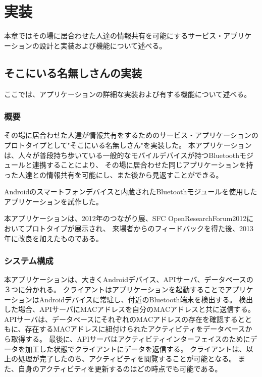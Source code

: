 \chapter{実装}\label{chap:implementation_1}

本章ではその場に居合わせた人達の情報共有を可能にするサービス・アプリケーションの設計と実装および機能について述べる。

\newpage

\section{そこにいる名無しさんの実装}

ここでは、アプリケーションの詳細な実装および有する機能について述べる。

\subsection{概要}

その場に居合わせた人達が情報共有をするためのサービス・アプリケーションのプロトタイプとして"そこにいる名無しさん"を実装した。
本アプリケーションは、人々が普段持ち歩いている一般的なモバイルデバイスが持つBluetoothモジュールと連携することにより、
その場に居合わせた同じアプリケーションを持った人達との情報共有を可能にし、また後から見返すことができる。

Androidのスマートフォンデバイスと内蔵されたBluetoothモジュールを使用したアプリケーションを試作した。

本アプリケーションは、2012年のつながり展、SFC OpenResearchForum2012においてプロトタイプが展示され、
来場者からのフィードバックを得た後、2013年に改良を加えたものである。


\subsection{システム構成}

本アプリケーションは、大きくAndroid\cite{AndroidDevelopers}デバイス、APIサーバ、データベースの３つに分かれる。
クライアントはアプリケーションを起動することでアプリケーションはAndroidデバイスに常駐し、付近のBluetooth端末を検出する。
検出した場合、APIサーバにMACアドレスを自分のMACアドレスと共に送信する。
APIサーバは、データベースにそれぞれのMACアドレスの存在を確認するとともに、存在するMACアドレスに紐付けられたアクティビティをデータベースから取得する。
最後に、APIサーバはアクティビティインターフェイスのためにデータを加工した状態でクライアントにデータを返信する。
クライアントは、以上の処理が完了したのち、アクティビティを閲覧することが可能となる。
また、自身のアクティビティを更新するのはどの時点でも可能である。

